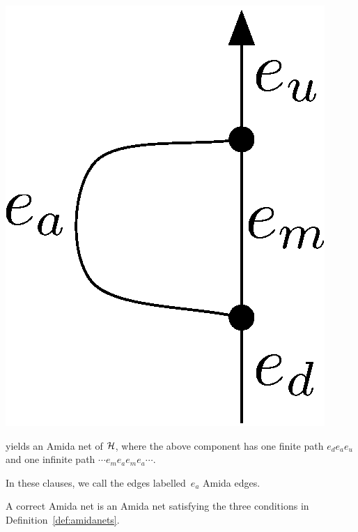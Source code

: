 \begin{definition}
\begin{itemize}
\begin{center}
	 \includegraphics[scale=0.4]{oneedge_amida.eps}
	\end{center}
       yields an Amida net of $\mathcal{H}$,
       where the above component has
       one finite path $e_de_ae_u$
       and one infinite path $\cdots e_m e_a e_m e_a \cdots$.
\end{itemize}
 \end{definition}
 In these clauses, we call the edges labelled~$e_a$ Amida edges.

 \begin{definition}
  A correct Amida net is an Amida net satisfying the three conditions
  in Definition~\ref{def:amidanets}.
 \end{definition}

